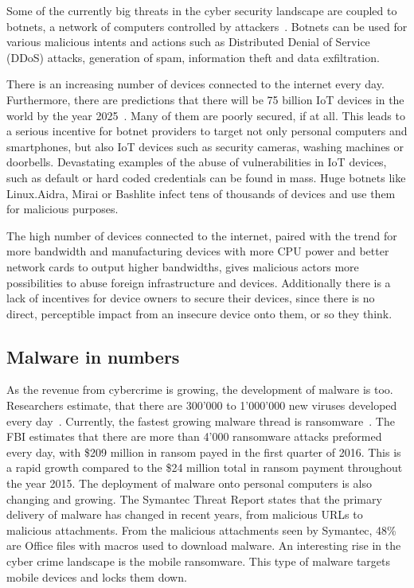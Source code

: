 Some of the currently big threats in the cyber security landscape are coupled to botnets, a network of computers controlled by attackers~\cite{Putman}.
Botnets can be used for various malicious intents and actions such as Distributed Denial of Service (DDoS) attacks, generation of spam, information theft and data exfiltration.

There is an increasing number of devices connected to the internet every day.
Furthermore, there are predictions that there will be 75 billion IoT devices in the world by the year 2025~\cite{Statista}.
Many of them are poorly secured, if at all.
This leads to a serious incentive for botnet providers to target not only personal computers and smartphones, but also IoT devices such as security cameras, washing machines or doorbells.
Devastating examples of the abuse of vulnerabilities in IoT devices, such as default or hard coded credentials can be found in mass.
Huge botnets like Linux.Aidra, Mirai or Bashlite infect tens of thousands of devices and use them for malicious purposes.

The high number of devices connected to the internet, paired with the trend for more bandwidth and manufacturing devices with more CPU power and better network cards to output higher bandwidths, gives malicious actors more possibilities to abuse foreign infrastructure and devices.
Additionally there is a lack of incentives for device owners to secure their devices, since there is no direct, perceptible impact from an insecure device onto them, or so they think.

\subsection{Malware in numbers}
As the revenue from cybercrime is growing, the development of malware is too.
Researchers estimate, that there are 300'000 to 1'000'000 new viruses developed every day~\cite{McAfee18}.
Currently, the fastest growing malware thread is ransomware~\cite{McAfee18}.
The FBI estimates that there are more than 4'000 ransomware attacks preformed every day, with \$209 million in ransom payed in the first quarter of 2016.
This is a rapid growth compared to the \$24 million total in ransom payment throughout the year 2015.
The deployment of malware onto personal computers is also changing and growing.
The Symantec Threat Report states that the primary delivery of malware has changed in recent years, from malicious URLs to malicious attachments.
From the malicious attachments seen by Symantec, 48\% are Office files with macros used to download malware.
An interesting rise in the cyber crime landscape is the mobile ransomware.
This type of malware targets mobile devices and locks them down.\cite{Symantec19}

